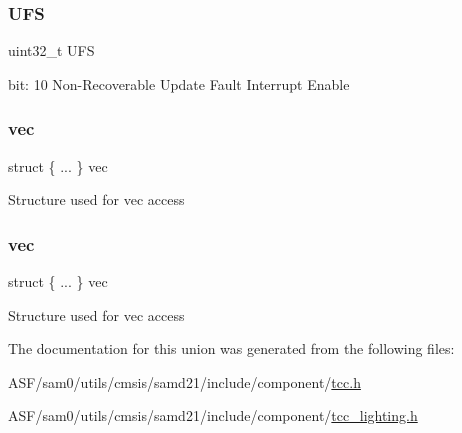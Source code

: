 \subsubsection{\texorpdfstring{UFS}{UFS}}
{\footnotesize\ttfamily uint32\+\_\+t U\+FS}

bit\+: 10 Non-\/\+Recoverable Update Fault Interrupt Enable \mbox{\label{union_t_c_c___i_n_t_e_n_c_l_r___type_a8bcbae4f39c1829ceb6d98589d329d27}} 
\subsubsection{\texorpdfstring{vec}{vec}\hspace{0.1cm}{\footnotesize\ttfamily [1/2]}}
{\footnotesize\ttfamily struct \{ ... \}   vec}

Structure used for vec access \mbox{\label{union_t_c_c___i_n_t_e_n_c_l_r___type_afbd7922d84a136a1f4933cf1854f1a7f}} 
\subsubsection{\texorpdfstring{vec}{vec}\hspace{0.1cm}{\footnotesize\ttfamily [2/2]}}
{\footnotesize\ttfamily struct \{ ... \}   vec}

Structure used for vec access 

The documentation for this union was generated from the following files\+:\begin{DoxyCompactItemize}
\item 
A\+S\+F/sam0/utils/cmsis/samd21/include/component/\mbox{\hyperlink{tcc_8h}{tcc.\+h}}\item 
A\+S\+F/sam0/utils/cmsis/samd21/include/component/\mbox{\hyperlink{tcc__lighting_8h}{tcc\+\_\+lighting.\+h}}\end{DoxyCompactItemize}
